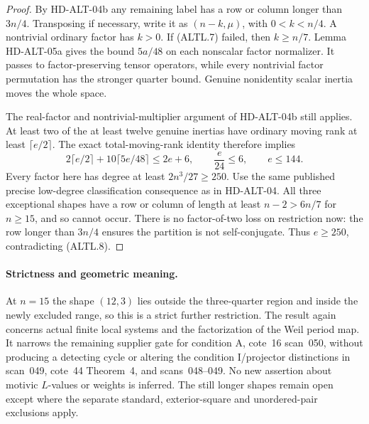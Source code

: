 \begin{proof}
By HD-ALT-04b any remaining label has a row or column longer
than $3n/4$. Transposing if necessary, write it as $(n-k,\mu)$,
with $0<k<n/4$. A nontrivial ordinary factor has $k>0$.
If (ALTL.7) failed, then $k\ge n/7$. Lemma HD-ALT-05a gives
the bound $5a/48$ on each nonscalar factor normalizer. It passes
to factor-preserving tensor operators, while every nontrivial
factor permutation has the stronger quarter bound. Genuine
nonidentity scalar inertia moves the whole space.

The real-factor and nontrivial-multiplier argument of HD-ALT-04b
still applies. At least two of the at least twelve genuine
inertias have ordinary moving rank at least $\lceil e/2\rceil$.
The exact total-moving-rank identity therefore implies
\[
 2\lceil e/2\rceil+10\lceil5e/48\rceil\le2e+6,
 \qquad \frac{e}{24}\le6,
 \qquad e\le144.
                                                               \tag{ALTL.8}
\]
Every factor here has degree at least $2n^3/27\ge250$.
Use the same published precise low-degree classification consequence
\cite[proof of Theorem~9.7, p.~312]{HD:GKT2019} as in HD-ALT-04.
All three exceptional shapes have a row or column of length
at least $n-2>6n/7$ for $n\ge15$, and so cannot occur.
There is no factor-of-two loss on restriction now: the row
longer than $3n/4$ ensures the partition is not self-conjugate.
Thus $e\ge250$, contradicting (ALTL.8).
\end{proof}

\paragraph{Strictness and geometric meaning.}
At $n=15$ the shape $(12,3)$ lies outside the three-quarter
region and inside the newly excluded range, so this is a strict
further restriction. The result again concerns actual finite
local systems and the factorization of the Weil period map.
It narrows the remaining supplier gate for condition A, cote~16
scan~050, without producing a detecting cycle or altering the
condition I/projector distinctions in scan~049, cote~44 Theorem~4,
and scans~048--049. No new assertion about motivic $L$-values
or weights is inferred. The still longer shapes remain open
except where the separate standard, exterior-square and
unordered-pair exclusions apply.
